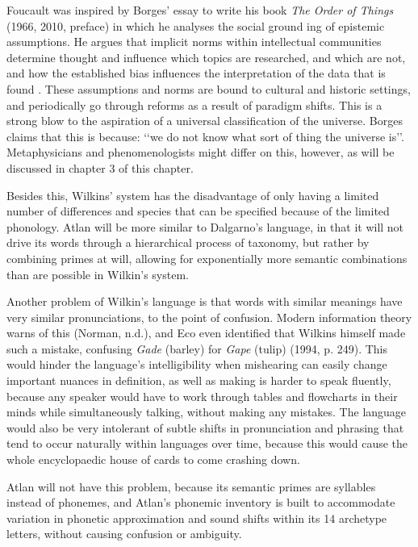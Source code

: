 Foucault was inspired by Borges’ essay to write his book \textit{The Order of Things} (1966, 2010, preface) in which he analyses the social ground ing of epistemic assumptions. He argues that implicit norms within intellectual communities determine thought and influence which topics are researched, and which are not, and how the established bias influences the interpretation of the data that is found . These assumptions and norms are bound  to cultural and historic settings, and periodically go through reforms as a result of paradigm shifts. This is a strong blow to the aspiration of a universal classification of the universe. Borges claims that this is because: ‘‘we do not know what sort of thing the universe is’’. Metaphysicians and phenomenologists might differ on this, however, as will be discussed in chapter 3 of this chapter.  

Besides this, Wilkins’ system has the disadvantage of only having a limited number of differences and species that can be specified because of the limited phonology. Atlan will be more similar to Dalgarno’s language, in that it will not drive its words through a hierarchical process of taxonomy, but rather by combining primes at will, allowing for exponentially more semantic combinations than are possible in Wilkin’s system. 

Another problem of Wilkin’s language is that words with similar meanings have very similar pronunciations, to the point of confusion. Modern information theory warns of this (Norman, n.d.), and Eco even identified that Wilkins himself made such a mistake, confusing {\it Gade} (barley) for {\it Gape} (tulip) (1994, p. 249). This would hinder the language’s intelligibility when mishearing can easily change important nuances in definition, as well as making is harder to speak fluently, because any speaker would have to work through tables and flowcharts in their minds while simultaneously talking, without making any mistakes. The language would also be very intolerant of subtle shifts in pronunciation and phrasing that tend to occur naturally within languages over time, because this would cause the whole encyclopaedic house of cards to come crashing down. 

Atlan will not have this problem, because its semantic primes are syllables instead of phonemes, and Atlan’s phonemic inventory is built to accommodate variation in phonetic approximation and sound shifts within its 14 archetype letters, without causing confusion or ambiguity. 

